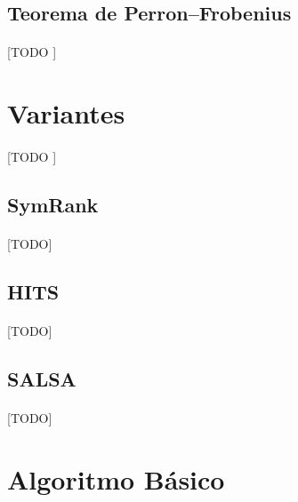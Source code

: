 \documentclass{subfiles}
\begin{document}
      \subsection{Teorema de Perron–Frobenius}
      \label{sec:perron_frobenius_theorem}

        \paragraph{}
        [TODO ]

    \section{Variantes}
    \label{sec:pagerank_variants}

      \paragraph{}
      [TODO ]

      \subsection{SymRank}
      \label{sec:symrank}

        \paragraph{}
        [TODO]

      \subsection{HITS}
      \label{sec:hits}

        \paragraph{}
        [TODO]

      \subsection{SALSA}
      \label{sec:salsa}

        \paragraph{}
        [TODO]

    \section{Algoritmo Básico}
    \label{sec:pagerank_algorithm}
\end{document}
